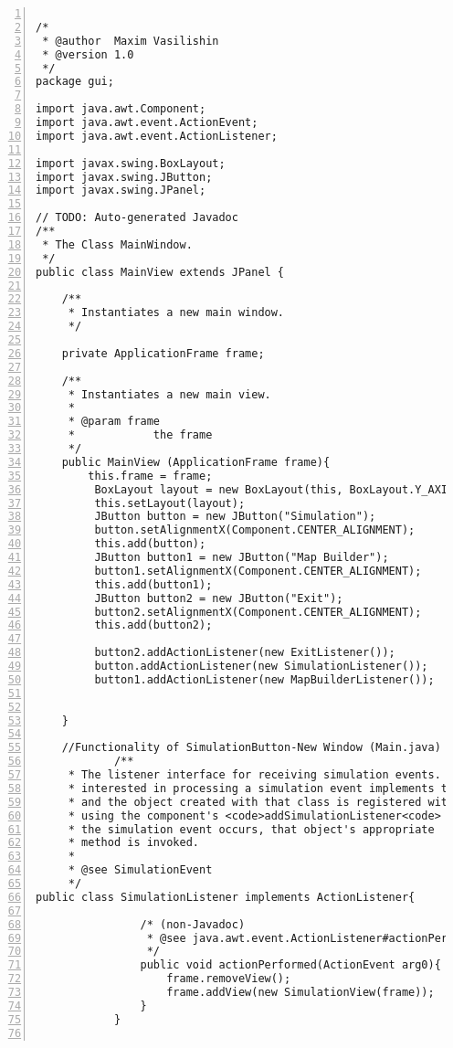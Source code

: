 \begin{lstlisting}[numbers=left, numberstyle=\small, numbersep=8pt,  framexleftmargin=1pt, framexrightmargin=10pt ]

/*
 * @author  Maxim Vasilishin
 * @version 1.0
 */
package gui;

import java.awt.Component;
import java.awt.event.ActionEvent;
import java.awt.event.ActionListener;

import javax.swing.BoxLayout;
import javax.swing.JButton;
import javax.swing.JPanel;

// TODO: Auto-generated Javadoc
/**
 * The Class MainWindow.
 */
public class MainView extends JPanel {
	
	/**
	 * Instantiates a new main window.
	 */
	
	private ApplicationFrame frame;
	
	/**
	 * Instantiates a new main view.
	 *
	 * @param frame
	 *            the frame
	 */
	public MainView (ApplicationFrame frame){
		this.frame = frame;
		 BoxLayout layout = new BoxLayout(this, BoxLayout.Y_AXIS);
		 this.setLayout(layout);
		 JButton button = new JButton("Simulation");
	     button.setAlignmentX(Component.CENTER_ALIGNMENT);
	     this.add(button);
	     JButton button1 = new JButton("Map Builder");
	     button1.setAlignmentX(Component.CENTER_ALIGNMENT);
	     this.add(button1);
	     JButton button2 = new JButton("Exit");
	     button2.setAlignmentX(Component.CENTER_ALIGNMENT);
	     this.add(button2);
	     
	     button2.addActionListener(new ExitListener());
		 button.addActionListener(new SimulationListener());
		 button1.addActionListener(new MapBuilderListener());
		 
		
	}
	
	//Functionality of SimulationButton-New Window (Main.java)
			/**
	 * The listener interface for receiving simulation events. The class that is
	 * interested in processing a simulation event implements this interface,
	 * and the object created with that class is registered with a component
	 * using the component's <code>addSimulationListener<code> method. When
	 * the simulation event occurs, that object's appropriate
	 * method is invoked.
	 *
	 * @see SimulationEvent
	 */
public class SimulationListener implements ActionListener{
				
				/* (non-Javadoc)
				 * @see java.awt.event.ActionListener#actionPerformed(java.awt.event.ActionEvent)
				 */
				public void actionPerformed(ActionEvent arg0){
					frame.removeView();
					frame.addView(new SimulationView(frame));
				}
			}
			

\end{lstlisting}
